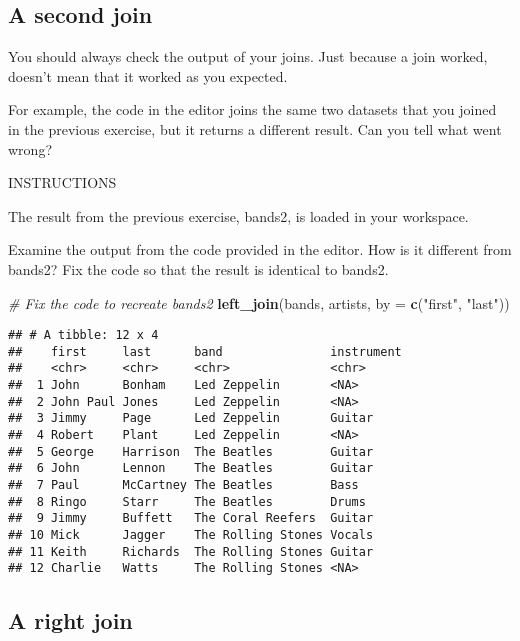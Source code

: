 \documentclass[]{article}
\newenvironment{Shaded}{\begin{snugshade}}{\end{snugshade}}
\newcommand{\KeywordTok}[1]{\textcolor[rgb]{0.13,0.29,0.53}{\textbf{#1}}}
\newcommand{\DataTypeTok}[1]{\textcolor[rgb]{0.13,0.29,0.53}{#1}}
\newcommand{\StringTok}[1]{\textcolor[rgb]{0.31,0.60,0.02}{#1}}
\newcommand{\CommentTok}[1]{\textcolor[rgb]{0.56,0.35,0.01}{\textit{#1}}}
\newcommand{\NormalTok}[1]{#1}
\begin{document}
\subsection{A second join}\label{a-second-join}

You should always check the output of your joins. Just because a join
worked, doesn't mean that it worked as you expected.

For example, the code in the editor joins the same two datasets that you
joined in the previous exercise, but it returns a different result. Can
you tell what went wrong?

INSTRUCTIONS

The result from the previous exercise, bands2, is loaded in your
workspace.

Examine the output from the code provided in the editor. How is it
different from bands2? Fix the code so that the result is identical to
bands2.

\begin{Shaded}
\begin{Highlighting}[]
\CommentTok{# Fix the code to recreate bands2}
\KeywordTok{left_join}\NormalTok{(bands, artists, }\DataTypeTok{by =} \KeywordTok{c}\NormalTok{(}\StringTok{"first"}\NormalTok{, }\StringTok{"last"}\NormalTok{))}
\end{Highlighting}
\end{Shaded}

\begin{verbatim}
## # A tibble: 12 x 4
##    first     last      band               instrument
##    <chr>     <chr>     <chr>              <chr>     
##  1 John      Bonham    Led Zeppelin       <NA>      
##  2 John Paul Jones     Led Zeppelin       <NA>      
##  3 Jimmy     Page      Led Zeppelin       Guitar    
##  4 Robert    Plant     Led Zeppelin       <NA>      
##  5 George    Harrison  The Beatles        Guitar    
##  6 John      Lennon    The Beatles        Guitar    
##  7 Paul      McCartney The Beatles        Bass      
##  8 Ringo     Starr     The Beatles        Drums     
##  9 Jimmy     Buffett   The Coral Reefers  Guitar    
## 10 Mick      Jagger    The Rolling Stones Vocals    
## 11 Keith     Richards  The Rolling Stones Guitar    
## 12 Charlie   Watts     The Rolling Stones <NA>
\end{verbatim}

\subsection{A right join}\label{a-right-join}
\end{document}
